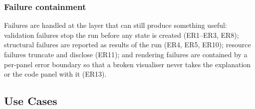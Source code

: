 \documentclass[11pt,a4paper]{article}
\begin{document}
\subsubsection{Failure containment}

Failures are handled at the layer that can still produce something useful:
validation failures stop the run before any state is created (ER1--ER3, ER8); structural
failures are reported as results of the run (ER4, ER5, ER10); resource failures truncate
and disclose (ER11); and rendering failures are contained by a per-panel error boundary so
that a broken visualiser never takes the explanation or the code panel with it (ER13).

\subsection{Use Cases}
\end{document}

